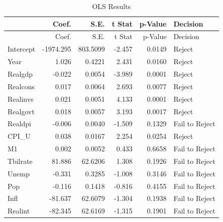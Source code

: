 \documentclass[11pt,]{article}
\newenvironment{Shaded}{\begin{snugshade}}{\end{snugshade}}
\newcommand{\KeywordTok}[1]{\textcolor[rgb]{0.13,0.29,0.53}{\textbf{#1}}}
\newcommand{\DataTypeTok}[1]{\textcolor[rgb]{0.13,0.29,0.53}{#1}}
\newcommand{\StringTok}[1]{\textcolor[rgb]{0.31,0.60,0.02}{#1}}
\newcommand{\CommentTok}[1]{\textcolor[rgb]{0.56,0.35,0.01}{\textit{#1}}}
\newcommand{\OperatorTok}[1]{\textcolor[rgb]{0.81,0.36,0.00}{\textbf{#1}}}
\newcommand{\NormalTok}[1]{#1}
\begin{document}
\begin{Shaded}
\end{Shaded}

\begin{longtable}[]{@{}lrrrrl@{}}
\caption{OLS Results}\tabularnewline
\toprule
& Coef. & S.E. & t Stat & p-Value & Decision\tabularnewline
\midrule
\endfirsthead
\toprule
& Coef. & S.E. & t Stat & p-Value & Decision\tabularnewline
\midrule
\endhead
Intercept & -1974.295 & 803.5099 & -2.457 & 0.0149 &
Reject\tabularnewline
Year & 1.026 & 0.4221 & 2.431 & 0.0160 & Reject\tabularnewline
Realgdp & -0.022 & 0.0054 & -3.989 & 0.0001 & Reject\tabularnewline
Realcons & 0.017 & 0.0064 & 2.693 & 0.0077 & Reject\tabularnewline
Realinvs & 0.021 & 0.0051 & 4.133 & 0.0001 & Reject\tabularnewline
Realgovt & 0.018 & 0.0057 & 3.193 & 0.0017 & Reject\tabularnewline
Realdpi & -0.006 & 0.0040 & -1.509 & 0.1329 & Fail to
Reject\tabularnewline
CPI\_U & 0.038 & 0.0167 & 2.254 & 0.0254 & Reject\tabularnewline
M1 & 0.002 & 0.0052 & 0.433 & 0.6658 & Fail to Reject\tabularnewline
Tbilrate & 81.886 & 62.6206 & 1.308 & 0.1926 & Fail to
Reject\tabularnewline
Unemp & -0.331 & 0.3285 & -1.008 & 0.3146 & Fail to
Reject\tabularnewline
Pop & -0.116 & 0.1418 & -0.816 & 0.4155 & Fail to Reject\tabularnewline
Infl & -81.637 & 62.6079 & -1.304 & 0.1938 & Fail to
Reject\tabularnewline
Realint & -82.345 & 62.6169 & -1.315 & 0.1901 & Fail to
Reject\tabularnewline
\bottomrule
\end{longtable}
\end{document}
